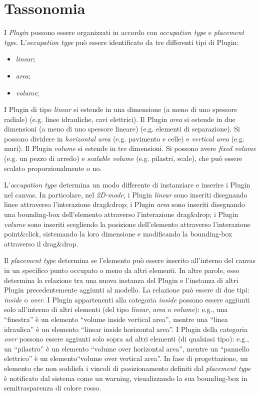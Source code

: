 \section{Tassonomia}
\label{sec:chapter_3_section_2}

\noindent
I \emph{Plugin} possono essere organizzati in accordo con \emph{occupation type} e \emph{placement type}.
L'\emph{occupation type} può essere identificato da tre differenti tipi di Plugin:
\begin{itemize}
  \item \emph{linear};
  \item \emph{area};
  \item \emph{volume};
\end{itemize}
I Plugin di tipo \emph{linear} si estende in una dimensione (a meno di uno spessore radiale) (e.g. linee idrauliche, cavi elettrici).
Il Plugin \emph{area} si estende in due dimensioni (a meno di uno spessore lineare) (e.g. elementi di separazione).
Si possono dividere in \emph{horizontal area} (e.g. pavimento e celle) e \emph{vertical area} (e.g. muri).
Il Plugin \emph{volume} si estende in tre dimensioni. Si possono avere \emph{fixed volume} (e.g. un pezzo di arredo) e
\emph{scalable volume} (e.g. pilastri, scale), che può essere scalato proporzionalmente o no.


L'\emph{occupation type} determina un modo differente di instanziare e inserire i Plugin nel canvas.
In particolare, nel \emph{2D-mode}, i Plugin \emph{linear} sono inseriti disegnando linee attraverso l'interazione drag\&drop;
i Plugin \emph{area} sono inseriti disegnando una bounding-box dell'elemento attraverso l'interazione drag\&drop;
i Plugin \emph{volume} sono inseriti scegliendo la posizione dell'elemento attraverso l'interazione point\&click,
sistemando la loro dimensione e modificando la bounding-box attraverso il drag\&drop.


Il \emph{placement type} determina se l'elemento può essere inserito all'interno del canvas in un specifico punto occupato o meno
da altri elementi. In altre parole, esso determina la relazione tra una nuova instanza del Plugin e l'instanza di altri
Plugin precedentemente aggiunti al modello. La relazione può essere di due tipi: \emph{inside} o \emph{over}.
I Plugin appartenenti alla categoria \emph{inside} possono essere aggiunti solo all'interno di altri elementi (del tipo
\emph{linear}, \emph{area} o \emph{volume}): e.g., una ``finestra'' è un elemento ``volume inside vertical area'',
mentre una ``linea idraulica'' \`e un elemento ``linear inside horizontal area''.
I Plugin della categoria \emph{over} possono essere aggiunti solo sopra ad altri elementi (di qualsiasi tipo):
e.g., un ``pilastro'' \`e un elemento ``volume over horizontal area'',
mentre un ``pannello elettrico'' è un elemento``volume over vertical area''.
In fase di progettazione, un elemento che non soddisfa i vincoli di posizionamento definiti dal \emph{placement type} \`e
notificato dal sistema come un warning, visualizzando la sua bounding-box in semitrasparenza di colore rosso.
\newpage
